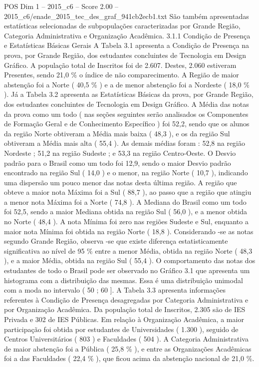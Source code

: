 \begin{textsample}{POS Dim 1 – 2015\_c6 – Score 2.00 – 2015\_c6/enade\_2015\_tec\_des\_graf\_941cb2ecb1.txt}
São também apresentadas estatísticas selecionadas de subpopulações caracterizadas por Grande Região, Categoria Administrativa e Organização Acadêmica. 3.1.1 Condição de Presença e Estatísticas Básicas Gerais A Tabela 3.1 apresenta a Condição de Presença na prova, por Grande Região, dos estudantes concluintes de Tecnologia em Design Gráfico.
A população total de Inscritos foi de 2.607.
Destes, 2.060 estiveram Presentes, sendo 21,0 \% o índice de não comparecimento.
A Região de maior abstenção foi a Norte ( 40,5 \% ) e a de menor abstenção foi a Nordeste ( 18,0 \% ).
Já a Tabela 3.2 apresenta as Estatísticas Básicas da prova, por Grande Região, dos estudantes concluintes de Tecnologia em Design Gráfico.
A Média das notas da prova como um todo ( nas seções seguintes serão analisados os Componentes de Formação Geral e de Conhecimento Específico ) foi 52,2, sendo que os alunos da região Norte obtiveram a Média mais baixa ( 48,3 ), e os da região Sul obtiveram a Média mais alta ( 55,4 ).
As demais médias foram : 52,8 na região Nordeste ; 51,2 na região Sudeste ; e 53,3 na região Centro-Oeste.
O Desvio padrão para o Brasil como um todo foi 12,9, sendo o maior Desvio padrão encontrado na região Sul ( 14,0 ) e o menor, na região Norte ( 10,7 ), indicando uma dispersão um pouco menor das notas desta última região.
A região que obteve a maior nota Máxima foi a Sul ( 88,7 ), ao passo que a região que atingiu a menor nota Máxima foi a Norte ( 74,8 ).
A Mediana do Brasil como um todo foi 52,5, sendo a maior Mediana obtida na região Sul ( 56,0 ), e a menor obtida no Norte ( 48,4 ).
A nota Mínima foi zero nas regiões Sudeste e Sul, enquanto a maior nota Mínima foi obtida na região Norte ( 18,8 ).
Considerando -se as notas segundo Grande Região, observa -se que existe diferença estatisticamente significativa ao nível de 95 \% entre a menor Média, obtida na região Norte ( 48,3 ), e a maior Média, obtida na região Sul ( 55,4 ).
O comportamento das notas dos estudantes de todo o Brasil pode ser observado no Gráfico 3.1 que apresenta um histograma com a distribuição das mesmas.
Essa é uma distribuição unimodal com a moda no intervalo ( 50 ; 60 ].
A Tabela 3.3 apresenta informações referentes à Condição de Presença desagregadas por Categoria Administrativa e por Organização Acadêmica.
Da população total de Inscritos, 2.305 são de IES Privada e 302 de IES Públicas.
Em relação à Organização Acadêmica, a maior participação foi obtida por estudantes de Universidades ( 1.300 ), seguido de Centros Universitários ( 803 ) e Faculdades ( 504 ).
A Categoria Administrativa de maior abstenção foi a Pública ( 25,8 \% ), e entre as Organizações Acadêmicas foi a das Faculdades ( 22,4 \% ), que ficou acima da abstenção nacional de 21,0 \%.

\end{textsample}
